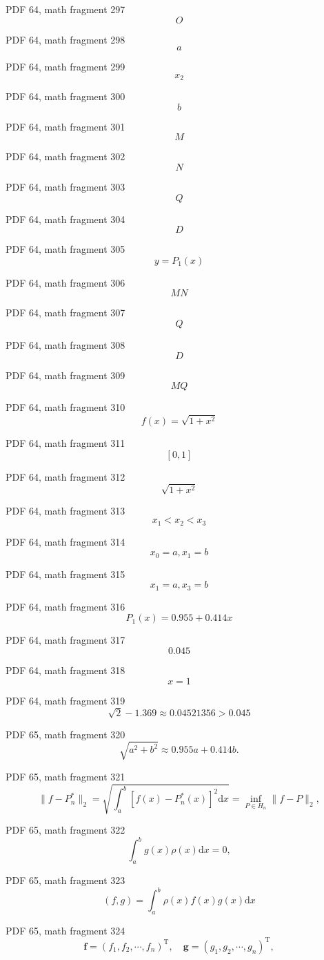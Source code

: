 \documentclass[UTF8,fontset=fandol]{ctexart}
\begin{document}
PDF 64, math fragment 297
\[O\]
\par
PDF 64, math fragment 298
\[a\]
\par
PDF 64, math fragment 299
\[x_2\]
\par
PDF 64, math fragment 300
\[b\]
\par
PDF 64, math fragment 301
\[M\]
\par
PDF 64, math fragment 302
\[N\]
\par
PDF 64, math fragment 303
\[Q\]
\par
PDF 64, math fragment 304
\[D\]
\par
PDF 64, math fragment 305
\[y=P_1(x)\]
\par
PDF 64, math fragment 306
\[MN\]
\par
PDF 64, math fragment 307
\[Q\]
\par
PDF 64, math fragment 308
\[D\]
\par
PDF 64, math fragment 309
\[MQ\]
\par
PDF 64, math fragment 310
\[f(x) = \sqrt{1+x^2}\]
\par
PDF 64, math fragment 311
\[[0, 1]\]
\par
PDF 64, math fragment 312
\[\sqrt{1+x^2}\]
\par
PDF 64, math fragment 313
\[x_1<x_2<x_3\]
\par
PDF 64, math fragment 314
\[x_0=a,x_1=b\]
\par
PDF 64, math fragment 315
\[x_1=a,x_3=b\]
\par
PDF 64, math fragment 316
\[P_1(x)=0.955+0.414x\]
\par
PDF 64, math fragment 317
\[0.045\]
\par
PDF 64, math fragment 318
\[x=1\]
\par
PDF 64, math fragment 319
\[\sqrt2-1.369\approx0.04521356>0.045\]
\par
PDF 65, math fragment 320
\[
\sqrt{a^2 + b^2} \approx 0.955a + 0.414b.
\]
\par
PDF 65, math fragment 321
\[
\|f - P_n^*\|_2 = \sqrt{\int_a^b [f(x) - P_n^*(x)]^2 \mathrm{d}x} = \inf_{P \in H_n} \|f - P\|_2, \tag{3.3.1}
\]
\par
PDF 65, math fragment 322
\[
\int_a^b g(x) \rho(x) \mathrm{d}x = 0, \tag{3.3.2}
\]
\par
PDF 65, math fragment 323
\[
(f,g) = \int_a^b \rho(x) f(x) g(x) \mathrm{d}x \tag{3.3.3}
\]
\par
PDF 65, math fragment 324
\[
\boldsymbol{f} = (f_1, f_2, \cdots, f_n)^{\mathrm{T}}, \quad \boldsymbol{g} = (g_1, g_2, \cdots, g_n)^{\mathrm{T}},
\]
\end{document}
